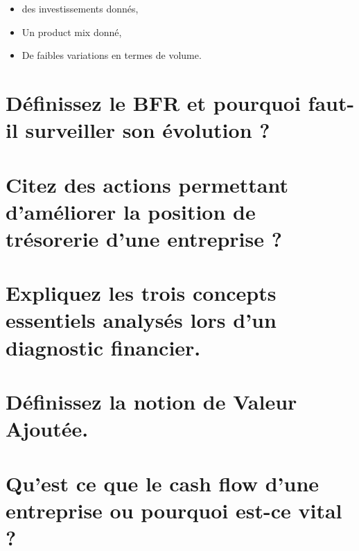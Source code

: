 \documentclass{article}
\begin{document}
\begin{itemize}
	\item des investissements donnés,
	\item Un product mix donné,
	\item De faibles variations en termes de volume.
\end{itemize}

\section{Définissez le BFR et pourquoi faut-il surveiller son évolution ?}
\section{Citez des actions permettant d’améliorer la position de trésorerie d’une entreprise ?}


\section{Expliquez les trois concepts essentiels analysés lors d’un diagnostic financier.}
\section{Définissez la notion de Valeur Ajoutée.}
\section{Qu’est ce que le cash flow d’une entreprise ou pourquoi est-ce vital ?}

\printbibliography
\end{document}
